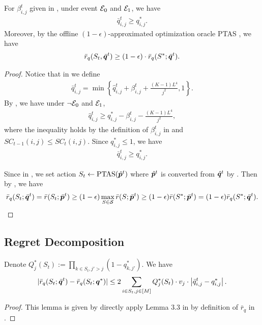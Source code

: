 \begin{lemma}
\label{lemma:optimism}
    For $\beta_{i,j}^t$ given in , under event ${\mathcal{E}}_0$ and ${\mathcal{E}}_1$, we have
    \begin{align*}
        \bar q_{i,j}^t \ge q^*_{i,j}.
    \end{align*}
    Moreover, by the offline $(1-\epsilon)$-approximated optimization oracle PTAS \citep{chen2013combinatorial}, we have
    \begin{align*}
        \bar r_q(S_t, \bar {{\bm{q}}}^t) \ge (1-\epsilon) \cdot \bar r_q(S^*; \bar {{\bm{q}}}^t).
    \end{align*}
\begin{proof}
Notice that in  we define
\begin{align*}
    \bar q_{i,j}^t = \min\left\{\hat q_{i,j}^t + \beta_{i,j}^t + \frac{(K-1)L^4}{j^2}, 1\right\}.
\end{align*}
By , we have under $\neg{\mathcal{E}}_0$ and ${\mathcal{E}}_1$,
\begin{align*}
    \hat q_{i,j}^t \ge q_{i,j}^* - \beta_{i,j}^t - \frac{(K-1)L^4}{j^2},
\end{align*}
where the inequality holds by the definition of $\beta_{i,j}^t$ in  and $SC_{t-1}(i,j) \le SC_t(i,j)$.
Since $q_{i,j}^* \le 1$, we have
\begin{align*}
    \bar q_{i,j}^t \ge q^*_{i,j}.
\end{align*}

Since in , we set action $S_t \leftarrow \operatorname{PTAS}(\hat {{\bm{p}}}^t)$ where $\hat{{\bm{p}}}^t$ is converted from $\hat{{\bm{q}}}^t$ by . Then by , we have
\begin{align*}
    \bar r_q(S_t; \bar{{\bm{q}}}^t) = \bar r(S_t; \bar{{\bm{p}}}^t)  \ge (1-\epsilon)\max_{S \in {\mathcal{S}}} \bar r(S; \bar {{\bm{p}}}^t) \ge (1-\epsilon)\bar r(S^*; \bar {{\bm{p}}}^t) = (1-\epsilon) \bar r_q(S^*; \bar {{\bm{q}}}^t).
\end{align*}
\end{proof}
\end{lemma}

\subsection{Regret Decomposition}

\begin{lemma}
\label{lemma:tpm-formal}
Denote $Q_j^*(S_t) :=  \prod_{k \in S_t, j' > j} (1 - q_{k,j'}^*)$. We have
\begin{align}
    |\bar r_q(S_t; \bar {{\bm{q}}}^t) - \bar r_q(S_t; {\bm{q}}^*)| \le 2\sum_{i \in S_t, j \in [M]} Q_j^*(S_t) \cdot v_j \cdot \left|\bar q_{i,j}^t - q^*_{i,j}\right|.
\end{align}
\begin{proof}
This lemma is given by directly apply Lemma 3.3 in \citet{wang2023combinatorial} by definition of $\bar r_q$ in .
\end{proof}
\end{lemma}

